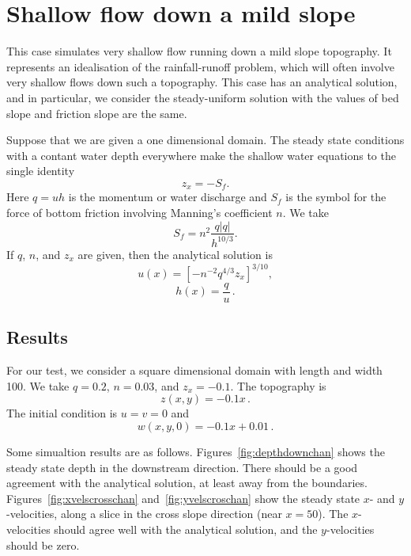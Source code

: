 

\section{Shallow flow down a mild slope}
This case simulates very shallow flow running down a mild slope topography. It represents an idealisation of the rainfall-runoff problem, which will often involve very shallow flows down such a topography. This case has an analytical solution, and in particular, we consider the steady-uniform solution with the values of bed slope and friction slope are the same.   

Suppose that we are given a one dimensional domain. The steady state conditions with a contant water depth everywhere make the shallow water equations to the single identity
\begin{equation}
z_x = - S_f.
\end{equation}
Here $q=uh$ is the momentum or water discharge and $S_f$ is the symbol for the force of bottom friction involving Manning's coefficient $n$. We take 
\begin{equation}
S_f = n^2 \frac{q|q|}{h^{10/3}}.
\end{equation}
If $q$, $n$, and $z_x$ are given, then the analytical solution is
\begin{equation}
u(x)= \left[- n^{-2} q^{4/3} z_x\right]^{3/10},
\end{equation}
\begin{equation}
h(x)= \frac{q}{u}\,.
\end{equation}

\subsection{Results}
For our test, we consider a square dimensional domain with length and width 100. We take $q=0.2$, $n=0.03$, and $z_x=-0.1$.
The topography is
\begin{equation}
z(x, y)= -0.1 x\,.
\end{equation}
The initial condition is $u=v=0$ and
\begin{equation}
w(x,y,0)= -0.1 x + 0.01\,.
\end{equation}


Some simualtion results are as follows.
Figures~\ref{fig:depthdownchan} shows the steady state depth in the downstream direction. There should be a good agreement with the analytical solution, at least away from the boundaries.  
Figures~\ref{fig:xvelscrosschan} and~\ref{fig:yvelscroschan} show the steady state $x$- and $y$-velocities, along a slice in the cross slope direction (near $x=50$). The $x$-velocities should agree well with the analytical solution, and the $y$-velocities should be zero. 


